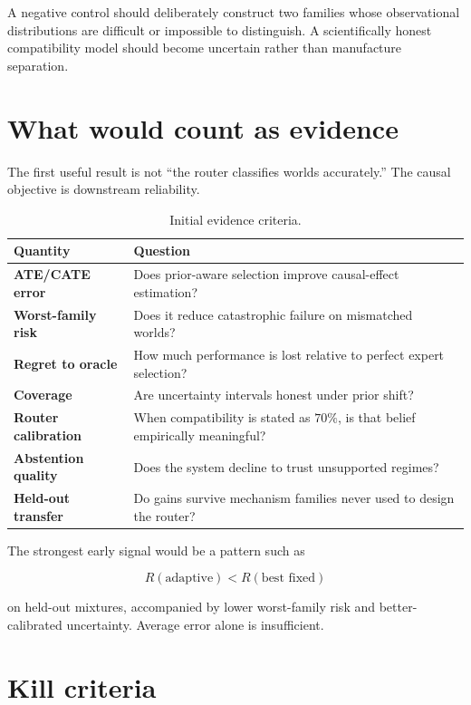 \documentclass[11pt]{article}
\begin{document}
A negative control should deliberately construct two families whose observational distributions are difficult or impossible to distinguish. A scientifically honest compatibility model should become uncertain rather than manufacture separation.

\section{What would count as evidence}

The first useful result is not ``the router classifies worlds accurately.'' The causal objective is downstream reliability.

\begin{table}[h]
\centering
\begin{tabularx}{\textwidth}{>{\bfseries}l X}
\toprule
Quantity & Question \\
\midrule
ATE/CATE error & Does prior-aware selection improve causal-effect estimation? \\
Worst-family risk & Does it reduce catastrophic failure on mismatched worlds? \\
Regret to oracle & How much performance is lost relative to perfect expert selection? \\
Coverage & Are uncertainty intervals honest under prior shift? \\
Router calibration & When compatibility is stated as $70\%$, is that belief empirically meaningful? \\
Abstention quality & Does the system decline to trust unsupported regimes? \\
Held-out transfer & Do gains survive mechanism families never used to design the router? \\
\bottomrule
\end{tabularx}
\caption{Initial evidence criteria.}
\end{table}

The strongest early signal would be a pattern such as

\begin{equation}
R(\text{adaptive}) < R(\text{best fixed})
\end{equation}

on held-out mixtures, accompanied by lower worst-family risk and better-calibrated uncertainty. Average error alone is insufficient.

\section{Kill criteria}
\end{document}
